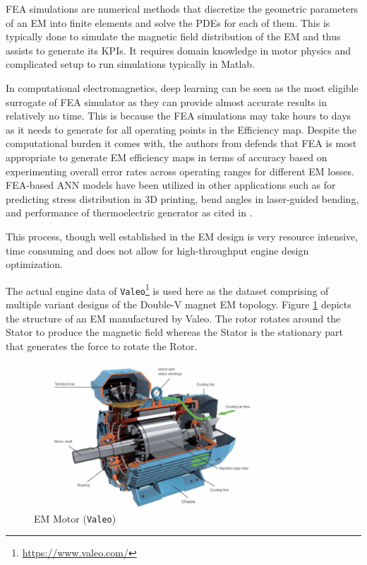 \documentclass{report} %
\begin{document}
\ac{FEA} simulations are numerical methods that discretize the geometric parameters of an \ac{EM} into finite elements and solve the \ac{PDE}s for each of them.
This is typically done to simulate the magnetic field distribution of the \ac{EM} and thus assists to generate its \ac{KPI}s.  
It requires domain knowledge in motor physics and complicated setup to run simulations typically in Matlab.

In computational electromagnetics, deep learning can be seen as the most eligible surrogate of \ac{FEA} simulator as they can provide almost accurate results in 
relatively no time. This is because the \ac{FEA} simulations may take hours to days as it needs to generate for all operating points in the Efficiency map.
Despite the computational burden it comes with, the authors from \cite{FEA-ETA-2017} defends that \ac{FEA} is most appropriate to 
generate \ac{EM} efficiency maps in terms of accuracy based on experimenting overall error rates across operating ranges for different \ac{EM} losses.
\ac{FEA}-based \ac{ANN} models have been utilized in other applications such as for predicting stress distribution in 3D printing, bend angles in laser-guided bending, 
and performance of thermoelectric generator as cited in \cite{SM EMT-2020}.

This process, though well established in the \ac{EM} design is very resource intensive, time consuming and does not allow for high-throughput engine design optimization. 

The actual engine data of \texttt{Valeo}\footnote{\url{https://www.valeo.com/}} is used here as the dataset comprising of multiple variant designs of the Double-V magnet \ac{EM} topology.
Figure \ref{fig:Valeo Motor Structure} depicts the structure of an \ac{EM} manufactured by Valeo. 
The rotor rotates around the Stator to produce the magnetic field whereas the Stator is the stationary part that generates the force to rotate the Rotor.         
\begin{figure}[H]
    \centering
    \includegraphics[width=0.75\textwidth]{./ReportImages/ValeoMotorStructure.jpg} 
    \caption{\ac{EM} Motor (\texttt{Valeo})}
    \label{fig:Valeo Motor Structure}
\end{figure}
\end{document}
